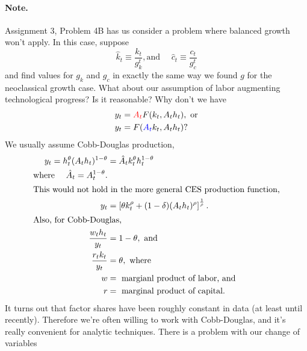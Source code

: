 \documentclass[11pt]{article}
\newcommand{\rd}{\textcolor{red}}
\begin{document}
\paragraph{Note.} Assignment 3, Problem 4B has us consider a problem where balanced growth won't apply. In this case, suppose
\[
\hat{k}_t \equiv \frac{k_t}{g^t_k}, \text{and }\quad \hat{c}_t \equiv \frac{c_t}{g_c^t}
\]
and find values for \(g_k\) and \(g_c\) in exactly the same way we found \(g\) for the neoclassical growth case. What about our assumption of labor augmenting technological progress? Is it reasonable? Why don't we have
\begin{align*}
y_t &= \rd{A_t} F(k_t, A_t h_t), \text{ or}\\
y_t &= F(\textcolor{blue}{A_t}k_t, A_t h_t)\text{?}
\end{align*}
We usually assume Cobb-Douglas production,
\begin{align*}
y_t = h^\theta_t(A_t h_t)^{1 - \theta} &= \hat{A}_t k^\theta_t h^{1 - \theta}_t\\
\text{where }\quad \hat{A}_t = A^{1 - \theta}_t.\\
\intertext{This would not hold in the more general CES production function,}
y_t &= \left[\theta k_t^\rho + (1 - \delta) (A_t h_t)^\rho \right]^{\frac{1}{\rho}}.\\
\intertext{Also, for Cobb-Douglas,}
\frac{w_t h_t}{y_t} &= 1 - \theta,\text{ and}\\
\frac{r_t k_t}{y_t} &= \theta, \text{ where}\\
w &= \text{ margianl product of labor, and}\\
r &= \text{ marginal product of capital.}
\end{align*}
It turns out that factor shares have been roughly constant in data (at least until recently). Therefore we're often willing to work with Cobb-Douglas, and it's really convenient for analytic techniques. There is a problem with our change of variables
\end{document}
